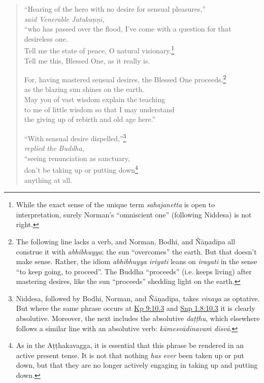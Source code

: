 \documentclass[12pt,openany]{book}%
\newcommand*{\scspeaker}[1]{\hspace{2em}\textit{#1}}
\begin{document}
\begin{verse}%
“Hearing of the hero with no desire for sensual pleasures,” \\
\scspeaker{said Venerable \textsanskrit{Jatukaṇṇī}, }\\
“who has passed over the flood, I’ve come with a question for that desireless one. \\
Tell me the state of peace, O natural visionary.\footnote{While the exact sense of the unique term \textit{sahajanetta} is open to interpretation, surely Norman’s “omniscient one” (following Niddesa) is not right. } \\
Tell me this, Blessed One, as it really is. 

For, having mastered sensual desires, the Blessed One proceeds,\footnote{The following line lacks a verb, and Norman, Bodhi, and \textsanskrit{Ñāṇadīpa} all construe it with \textit{abhibhuyya}: the sun “overcomes” the earth. But that doesn’t make sense. Rather, the idiom \textit{abhibhuyya iriyati} leans on \textit{irayati} in the sense “to keep going, to proceed”. The Buddha “proceeds” (i.e. keeps living) after mastering desires, like the sun “proceeds” shedding light on the earth. } \\
as the blazing sun shines on the earth. \\
May you of vast wisdom explain the teaching \\
to me of little wisdom so that I may understand \\
the giving up of rebirth and old age here.” 

“With sensual desire dispelled,”\footnote{Niddesa, followed by Bodhi, Norman, and \textsanskrit{Ñāṇadīpa}, takes \textit{vinaya} as optative. But where the same phrase occurs at \href{https://suttacentral.net/kp9/en/sujato\#10.3}{Kp 9:10.3} and \href{https://suttacentral.net/snp1.8/en/sujato\#10.3}{Snp 1.8:10.3} it is clearly absolutive. Moreover, the next includes the absolutive \textit{\textsanskrit{daṭṭhu}}, which elsewhere follows a similar line with an absolutive verb: \textit{\textsanskrit{kāmesvādīnavaṁ} \textsanskrit{disvā}}. } \\
\scspeaker{replied the Buddha, }\\
“seeing renunciation as sanctuary, \\
don’t be taking up or putting down\footnote{As in the \textsanskrit{Aṭṭhakavagga}, it is essential that this phrase be rendered in an active present tense. It is not that nothing \emph{has ever} been taken up or put down, but that they are no longer actively engaging in taking up and putting down. } \\
anything at all. 


\end{verse}
\end{document}
